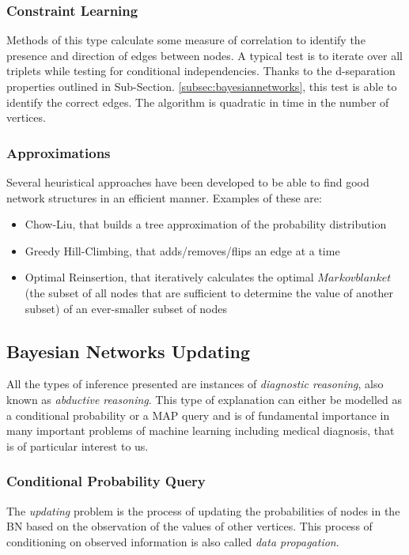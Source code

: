 \subsubsection{Constraint Learning}
Methods of this type calculate some measure of correlation to identify the presence and direction of edges between nodes.
A typical test is to iterate over all triplets while testing for conditional independencies.
Thanks to the d-separation properties outlined in Sub-Section. \ref{subsec:bayesiannetworks}, this test is able to identify the correct edges.
The algorithm is quadratic in time in the number of vertices.

\subsubsection{Approximations}
Several heuristical approaches have been developed to be able to find good network structures in an efficient manner.
Examples of these are:
\begin{itemize}
  \item Chow-Liu, that builds a tree approximation of the probability distribution
  \item Greedy Hill-Climbing, that adds/removes/flips an edge at a time
  \item Optimal Reinsertion, that iteratively calculates the optimal $Markov blanket$ (the subset of all nodes that are sufficient to determine the value of another subset) of an ever-smaller subset of nodes
\end{itemize}

\subsection{Bayesian Networks Updating} \label{subsec:bnupdating}
All the types of inference presented are instances of \textit{diagnostic reasoning}, also known as \textit{abductive reasoning}.  
This type of explanation can either be modelled as a conditional probability or a MAP query and is of fundamental importance in many important problems of machine learning including medical diagnosis, that is of particular interest to us.

\subsubsection{Conditional Probability Query}
The \textit{updating} problem is the process of updating the probabilities of nodes in the BN based on the observation of the values of other vertices.
This process of conditioning on observed information is also called \textit{data propagation}.

